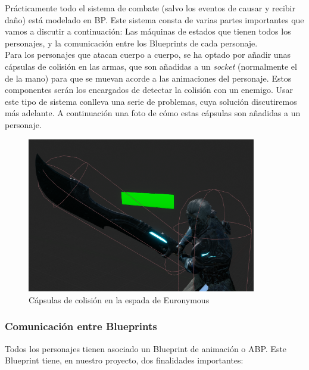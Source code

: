 Prácticamente todo el sistema de combate (salvo los eventos de causar y recibir daño) está modelado en \ac{BP}. Este sistema consta de varias partes importantes que vamos a discutir a continuación: Las máquinas de estados que tienen todos los personajes, y la comunicación entre los Blueprints de cada personaje.
\\

Para los personajes que atacan cuerpo a cuerpo, se ha optado por añadir unas cápsulas de colisión en las armas, que son añadidas a un \textit{socket} (normalmente el de la mano) para que se muevan acorde a las animaciones del personaje. Estos componentes serán los encargados de detectar la colisión con un enemigo. Usar este tipo de sistema conlleva una serie de problemas, cuya solución discutiremos más adelante. A continuación una foto de cómo estas cápsulas son añadidas a un personaje.


\begin{figure}[H]
  \centering
  \includegraphics[width=10cm]{./images/Eur_Weapon.png}
  \caption{Cápsulas de colisión en la espada de Euronymous}
  \label{HenkkaSM}
\end{figure}


\subsubsection{Comunicación entre Blueprints}

Todos los personajes tienen asociado un Blueprint de animación o \ac{ABP}. Este Blueprint tiene, en nuestro proyecto, dos finalidades importantes:


